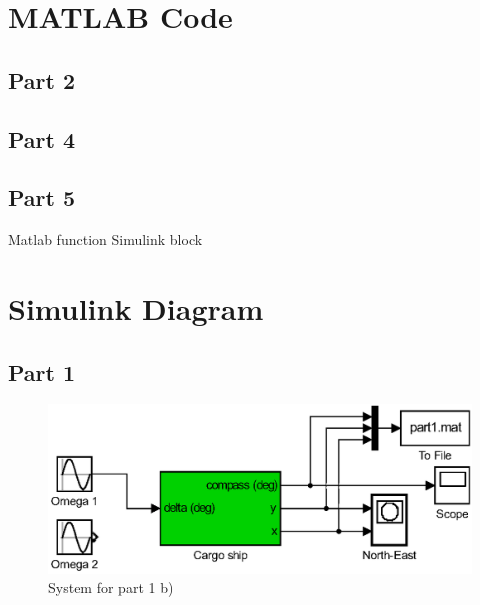 
\appendix


\section{MATLAB Code} \label{sec:matlab_code}
\subsection{Part 2} 



\subsection{Part 4}


\subsection{Part 5}
Matlab function Simulink block 

\label{mat:part5}

\newpage
\section{Simulink Diagram} \label{sec:simulink_diagrams}

\subsection{Part 1}
\begin{figure}[H]
    \begin{center}
    \includegraphics[width=1\linewidth]{Part1_pics/p5p1b.eps}
    \caption{System for part 1 b)}\label{sim:part1b}
    \end{center}
\end{figure}

